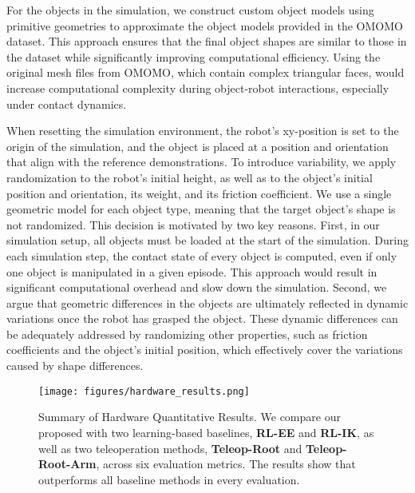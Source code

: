 For the objects in the simulation, we construct custom object models using primitive geometries to approximate the object models provided in the OMOMO dataset. This approach ensures that the final object shapes are similar to those in the dataset while significantly improving computational efficiency. Using the original mesh files from OMOMO, which contain complex triangular faces, would increase computational complexity during object-robot interactions, especially under contact dynamics.



When resetting the simulation environment, the robot's xy-position is set to the origin of the simulation, and the object is placed at a position and orientation that align with the reference demonstrations. To introduce variability, we apply randomization to the robot's initial height, as well as to the object's initial position and orientation, its weight, and its friction coefficient. We use a single geometric model for each object type, meaning that the target object's shape is not randomized. This decision is motivated by two key reasons. First, in our simulation setup, all objects must be loaded at the start of the simulation. During each simulation step, the contact state of every object is computed, even if only one object is manipulated in a given episode. This approach would result in significant computational overhead and slow down the simulation. Second, we argue that geometric differences in the objects are ultimately reflected in dynamic variations once the robot has grasped the object. These dynamic differences can be adequately addressed by randomizing other properties, such as friction coefficients and the object's initial position, which effectively cover the variations caused by shape differences. 





\begin{figure*}[t]
 \centering
\texttt{[image: figures/hardware\_results.png]}

 \vspace{-.5em}
\caption{Summary of Hardware Quantitative Results. We compare our proposed \textbf{\method} with two learning-based baselines, \textbf{RL-EE} and \textbf{RL-IK}, as well as two teleoperation methods, \textbf{Teleop-Root} and \textbf{Teleop-Root-Arm}, across six evaluation metrics. The results show that \textbf{\method} outperforms all baseline methods in every evaluation.}
\label{fig:hardware_results}
 \vspace{-0.5cm}
\end{figure*}


